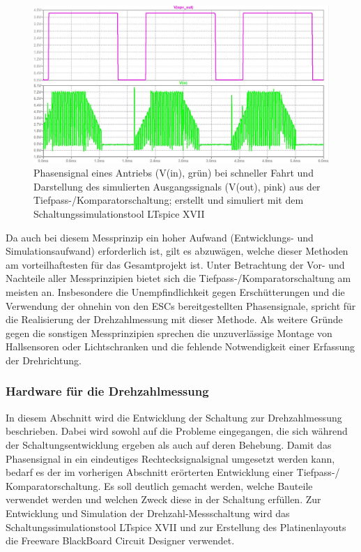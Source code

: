 \begin{figure}[H] %
\includegraphics[width=.92\textwidth]{sec4/images/Signaldarstellung} 
\centering
\captionsetup{width=.95\textwidth}
\caption[Phaseneingangssignal und Ausgangssignal der Tiefpass-/Komparatorschaltung]{Phasensignal eines Antriebs (V(in), grün) bei schneller Fahrt und Darstellung des simulierten Ausgangssignals (V(out), pink) aus der Tiefpass-/Komparatorschaltung; erstellt und simuliert mit dem Schaltungssimulationstool LTspice XVII}\centering
\label{fig:Signaldarstellung}
\end{figure}

Da auch bei diesem Messprinzip ein hoher Aufwand (Entwicklungs- und Simulationsaufwand) erforderlich ist, gilt es abzuwägen, welche dieser Methoden am vorteilhaftesten für das Gesamtprojekt ist. Unter Betrachtung der Vor- und Nachteile aller Messprinzipien bietet sich die Tiefpass-/Komparatorschaltung am meisten an. Insbesondere die Unempfindlichkeit gegen Erschütterungen und die Verwendung der ohnehin von den ESCs bereitgestellten Phasensignale, spricht für die Realisierung der Drehzahlmessung mit dieser Methode. Als weitere Gründe gegen die sonstigen Messprinzipien sprechen die unzuverlässige Montage von Hallsensoren oder Lichtschranken und die fehlende Notwendigkeit einer Erfassung der Drehrichtung.

\newpage

\subsubsection{Hardware für die Drehzahlmessung}\label{Sec4Sub5Sub3}

In diesem Abschnitt wird die Entwicklung der Schaltung zur Drehzahlmessung beschrieben. Dabei wird sowohl auf die Probleme eingegangen, die sich während der Schaltungsentwicklung ergeben als auch auf deren Behebung. Damit das Phasensignal in ein eindeutiges Rechtecksignalsignal umgesetzt werden kann, bedarf es der im vorherigen Abschnitt erörterten Entwicklung einer Tiefpass-/ Komparatorschaltung. Es soll deutlich gemacht werden, welche Bauteile verwendet werden und welchen Zweck diese in der Schaltung erfüllen. Zur Entwicklung und Simulation der Drehzahl-Messschaltung wird das Schaltungssimulationstool LTspice XVII und zur Erstellung des Platinenlayouts die Freeware BlackBoard Circuit Designer verwendet.\vspace{11pt}

